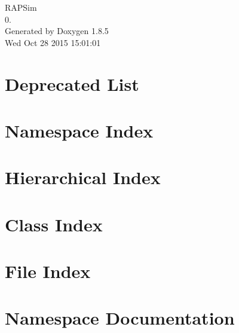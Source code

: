 \documentclass[twoside]{book}
\newcommand{\clearemptydoublepage}{%
  \newpage{\pagestyle{empty}\cleardoublepage}%
}
\begin{document}
\begin{titlepage}
\vspace*{7cm}
\begin{center}%
{\Large R\-A\-P\-Sim \\[1ex]\large 0. }\\
\vspace*{1cm}
{\large Generated by Doxygen 1.8.5}\\
\vspace*{0.5cm}
{\small Wed Oct 28 2015 15:01:01}\\
\end{center}
\end{titlepage}
\clearemptydoublepage
\tableofcontents
\clearemptydoublepage
{}

\chapter{Deprecated List}
\label{deprecated}

\chapter{Namespace Index}

\chapter{Hierarchical Index}

\chapter{Class Index}

\chapter{File Index}

\chapter{Namespace Documentation}

















\end{document}
